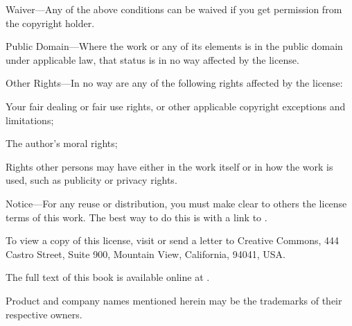 \begin{swcitemize}
  \item Waiver---Any of the above conditions can be waived if you get
    permission from the copyright holder.
  \item Public Domain---Where the work or any of its elements is in
    the public domain under applicable law, that status is in no way
    affected by the license.

  \item Other Rights---In no way are any of the following rights
    affected by the license:
    \begin{swcitemize2}

      \item Your fair dealing or fair use rights, or other applicable
        copyright exceptions and limitations;

      \item The author's moral rights;

      \item Rights other persons may have either in the work itself or
        in how the work is used, such as publicity or privacy rights.

    \end{swcitemize2}

  \item Notice---For any reuse or distribution, you must make clear to
    others the license terms of this work. The best way to do this is
    with a link to .

\end{swcitemize}

\noindent To view a copy of this license, visit
 or send a letter to Creative
Commons, 444 Castro Street, Suite 900, Mountain View, California,
94041, USA.\\

\vspace{0.15cm}

\noindent
The full text of this book is available online at .\\

\vfill

\noindent Product and company names mentioned herein may be the trademarks of
their respective owners.\\

\vspace{0.15cm}

